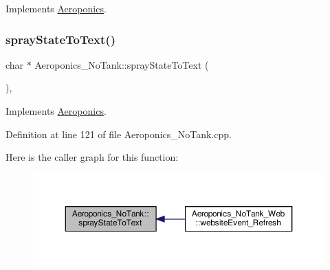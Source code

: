 Implements \hyperlink{class_aeroponics_a961b5818322eb6d0268d2f2f4763768e}{Aeroponics}.

\mbox{\label{class_aeroponics___no_tank_aa5c6ddd4017a8666d0205da53f04c36d}} 
\subsubsection{\texorpdfstring{spray\+State\+To\+Text()}{sprayStateToText()}\hspace{0.1cm}{\footnotesize\ttfamily [1/2]}}
{\footnotesize\ttfamily char $\ast$ Aeroponics\+\_\+\+No\+Tank\+::spray\+State\+To\+Text (\begin{DoxyParamCaption}{ }\end{DoxyParamCaption})\hspace{0.3cm}{\ttfamily [protected]}, {\ttfamily [virtual]}}



Implements \hyperlink{class_aeroponics_aa79435aaa49a563d41ae092ec3e87e06}{Aeroponics}.



Definition at line 121 of file Aeroponics\+\_\+\+No\+Tank.\+cpp.

Here is the caller graph for this function\+:
\nopagebreak
\begin{figure}[H]
\begin{center}
\leavevmode
\includegraphics[width=350pt]{class_aeroponics___no_tank_aa5c6ddd4017a8666d0205da53f04c36d_icgraph}
\end{center}
\end{figure}
\mbox{\label{class_aeroponics___no_tank_a9776da3e3fdf7d687609ba72ea59af5f}} 

